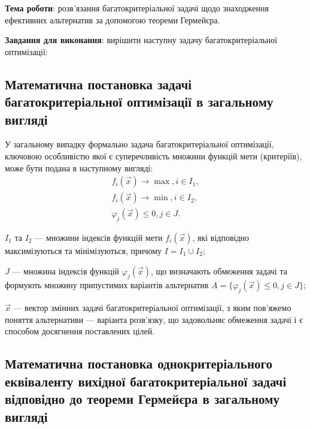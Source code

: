 


\newcommand{\labnumber}{2} %



\usepackage{systeme}
\usepackage{longtable,tabu}
\usepackage{multirow}
\usepackage{array,multirow}
\usepackage{pdflscape}
\usepackage{afterpage}
\usepackage{bm}

\graphicspath{{figures/}}


\Ukrainian


\addtocounter{page}{1}

\textbf{Тема роботи}: розв'язання багатокритеріальної задачі щодо знаходження ефективних альтернатив за допомогою теореми Гермейєра.

\textbf{Завдання для виконання}: вирішити наступну задачу багатокритеріальної оптимізації:


\subsection{Математична постановка задачі багатокритеріальної оптимізації в загальному вигляді}

У загальному випадку формально задача багатокритеріальної оптимізації, ключовою особливістю якої є суперечливість множини функцій мети (критеріїв), може бути подана в наступному вигляді:
\begin{gather*} 
	f_i(\vec{x}) \to \max, i \in I_1, \\
	f_i(\vec{x}) \to \min, i \in I_2, \\
	\varphi_j(\vec{x}) \leq 0, j \in J.
\end{gather*}
\begin{description}
	\item[де] $I_1$ та $I_2$ --- множини індексів функцій мети $f_i(\vec{x})$, які відповідно максимізуються та мінімізуються, причому $I=I_1 \cup I_2$;
	\item $J$ --- множина індексів функцій $\varphi_j(\vec{x})$, що визначають обмеження задачі та формують множину припустимих варіантів альтернатив $A = \{ \varphi_j(\vec{x}) \leq 0, j \in J \}$;
	\item $\vec{x}$ --- вектор змінних задачі багатокритеріальної оптимізації, з яким пов’яжемо поняття альтернативи --- варіанта розв’язку, що задовольняє обмеження задачі і є способом досягнення поставлених цілей.
\end{description}

\subsection{Математична постановка однокритеріального еквіваленту вихідної багатокритеріальної задачі відповідно до теореми Гермейєра в загальному вигляді}

